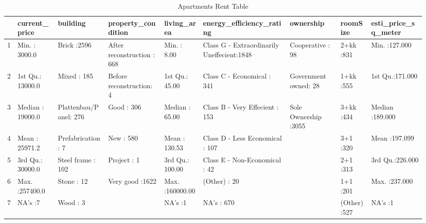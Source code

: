 \begin{table}[ht]
\centering
\begin{tabular}{rllllllll}
  \hline
 & current\_price &             building &             property\_condition &  living\_area &                          energy\_efficiency\_rating &            ownership &    roomSize & esti\_price\_sq\_meter \\ 
  \hline
1 & Min.   :  3000.0   & Brick           :2596   & After reconstruction : 668   & Min.   :     8.00   & Class G - Extraordinarily Uneffecient:1848   & Cooperative     :  98   & 2+kk   :831   & Min.   :127.000   \\ 
  2 & 1st Qu.: 13000.0   & Mixed           : 185   & Before reconstruction:   4   & 1st Qu.:    45.00   & Class C - Economical                 : 341   & Government owned:  28   & 1+kk   :555   & 1st Qu.:171.000   \\ 
  3 & Median : 19000.0   & Plattenbau/Panel: 276   & Good                 : 306   & Median :    65.00   & Class B - Very Effecient             : 153   & Sole Ownership  :3055   & 3+kk   :434   & Median :189.000   \\ 
  4 & Mean   : 25971.2   & Prefabrication  :   7   & New                  : 580   & Mean   :   130.53   & Class D - Less Economical            : 107   &  & 3+1    :320   & Mean   :197.099   \\ 
  5 & 3rd Qu.: 30000.0   & Steel frame     : 102   & Project              :   1   & 3rd Qu.:   100.00   & Class E - Non-Economical             :  42   &  & 2+1    :313   & 3rd Qu.:226.000   \\ 
  6 & Max.   :257400.0   & Stone           :  12   & Very good            :1622   & Max.   :160000.00   & (Other)                              :  20   &  & 1+1    :201   & Max.   :237.000   \\ 
  7 & NA's   :7   & Wood            :   3   &  & NA's   :1   & NA's                                 : 670   &  & (Other):527   & NA's   :1   \\ 
   \hline
\end{tabular}
\caption{Apartments Rent Table} 
\label{tab:one}
\end{table}

